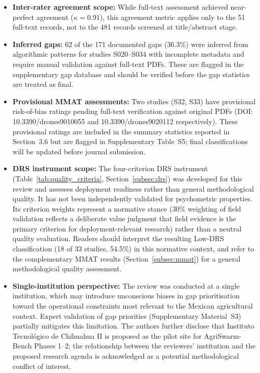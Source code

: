 \documentclass[review,3p,times]{elsarticle}
\begin{document}
\begin{itemize}
  \item \textbf{Inter-rater agreement scope:} While full-text assessment achieved 
near-perfect agreement ($\kappa=0.91$), this agreement metric applies only to the 
51 full-text records, not to the 481 records screened at title/abstract stage.
  \item \textbf{Inferred gaps:} 62 of the 171 documented gaps (36.3\%) were inferred from algorithmic patterns for studies S020--S034 with incomplete metadata and require manual validation against full-text PDFs. These are flagged in the supplementary gap database and should be verified before the gap statistics are treated as final.
  \item \textbf{Provisional MMAT assessments:} Two studies (S32, S33) have provisional risk-of-bias ratings pending full-text verification against original PDFs (DOI: 10.3390/drones9010055 and 10.3390/drones9020112 respectively). These provisional ratings are included in the summary statistics reported in Section~3.6 but are flagged in Supplementary Table~S5; final classifications will be updated before journal submission.
  \item \textbf{DRS instrument scope:} The four-criterion DRS instrument (Table~\ref{tab:quality_criteria}, Section~\ref{subsec:drs}) was developed for this review and assesses deployment readiness rather than general methodological quality. It has not been independently validated for psychometric properties. Its criterion weights represent a normative stance (30\% weighting of field validation reflects a deliberate value judgment that field evidence is the primary criterion for deployment-relevant research) rather than a neutral quality evaluation. Readers should interpret the resulting Low-DRS classification (18 of 33 studies, 54.5\%) in this normative context, and refer to the complementary MMAT results (Section~\ref{subsec:mmat}) for a general methodological quality assessment.
  \item \textbf{Single-institution perspective:} The review was conducted at a single institution, which may introduce unconscious biases in gap prioritisation toward the operational constraints most relevant to the Mexican agricultural context. Expert validation of gap priorities (Supplementary Material~S3) partially mitigates this limitation. The authors further disclose that Instituto Tecnológico de Chihuahua II is proposed as the pilot site for AgriSwarm-Bench Phases 1--2; the relationship between the reviewers' institution and the proposed research agenda is acknowledged as a potential methodological conflict of interest.
\end{itemize}
\end{document}
